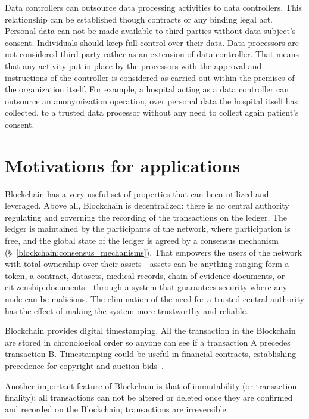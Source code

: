 Data controllers can outsource data processing activities to data controllers. This relationship can be established though contracts or any binding legal act. Personal data can not be made available to third parties without data subject's consent. Individuals should keep full control over their data. Data processors are not considered third party rather as an extension of data controller. That means that any activity put in place by the processors with the approval and instructions of the controller is considered as carried out within the premises of the organization itself. For example, a hospital acting as a data controller can outsource an anonymization operation, over personal data the hospital itself has collected, to a trusted data processor without any need to collect again patient's consent.

\section{Motivations for applications}\label{problem:motivations}

Blockchain has a very useful set of properties that can been utilized and leveraged. Above all, Blockchain is decentralized: there is no central authority regulating and governing the recording of the transactions on the ledger. The ledger is maintained by the participants of the network, where participation is free, and the global state of the ledger is agreed by a consensus mechanism (§~\ref{blockchain:consensus_mechanisms}). That empowers the users of the network with total ownership over their assets---assets can be anything ranging form a token, a contract, datasets, medical records, chain-of-evidence documents, or citizenship documents---through a system that guarantees security where any node can be malicious. The elimination of the need for a trusted central authority has the effect of making the system more trustworthy and reliable.

Blockchain provides digital timestamping. All the transaction in the Blockchain are stored in chronological order so anyone can see if a transaction A precedes transaction B. Timestamping could be useful in financial contracts, establishing precedence for copyright and auction bids~\cite{bl_auditability}.

Another important feature of Blockchain is that of immutability (or transaction finality): all transactions can not be altered or deleted once they are confirmed and recorded on the Blockchain; transactions are irreversible.

